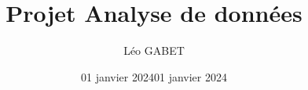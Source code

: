 \documentclass[french,]{compterendu}
\title{Projet Analyse de données}
\author{Léo GABET}
\date{01 janvier 2024}
\date{01 janvier 2024}
\theoremstyle{urcastyle}
\theoremstyle{remark}
\begin{document}

\newtheorem{lemme}{Lemme}[section]
\newtheorem{theoreme}{Théorème}[section]
\newtheorem{corollaire}{Corollaire}[section]
\newtheorem{propriete}{Propriété}[section]
\newtheorem{proprietes}{Propriétés}[section]



\maketitle

% 
% 
\end{document}
